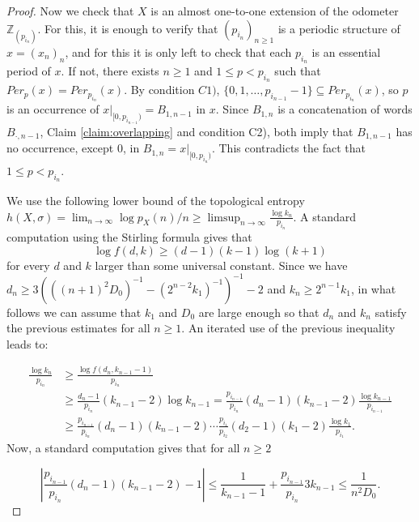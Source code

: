 \documentclass{daj}
\theoremstyle{plain}
\theoremstyle{definition}
\begin{document}
\begin{proof}
	
	Now we check that $X$ is an almost one-to-one extension of the odometer $\mathbb{Z}_{(p_{i_n})}$. 
	For this, it is enough to verify that $(p_{i_n})_{n\geq 1}$ is a periodic structure of $x = (x_{n})_{n}$, and for this it is only left to check that each $p_{i_n}$ is an essential period of $x$. If not, there exists $n \geq 1$ and $1 \leq p <p_{i_n}$ such that $Per_p(x) = Per_{p_{i_n}}(x)$. 
	By condition  $C1)$, $\{0,1,  \ldots, p_{i_{n-1}} -1 \} \subseteq   Per_{p_{i_n}}(x)$, so  $p$ is an occurrence of  $x|_{[0,p_{i_{n-1}})} =  B_{1,n-1}$ in $x$.  Since $B_{1,n}$ is a concatenation of words $B_{\cdot, n-1}$, Claim \ref{claim:overlapping} and condition C2), both  imply that $B_{1,n-1}$ has no  occurrence, except $0$,   in  $B_{1,n} = x|_{[0,p_{i_{n}})}$. This contradicts the fact that $1 \leq p <p_{i_n}$.
	
	
	\medskip
	
	We use the following lower bound of the topological entropy 
	$\displaystyle h(X,\sigma)= \lim_{n\to \infty }\log p_X(n)/n \ge  \limsup_{n\to \infty} \frac{\log k_{n}}{p_{i_{n}}}$.
	A standard computation using the Stirling formula gives that $$ \displaystyle \log f(d,k)   \geq   (d-1)(k-1) \log (k+1)$$ for every $d$ and $k$ larger than some universal constant. 
	Since we have $d_{n} \ge 3 ( ((n+1)^2 D_{0})^{-1}  - (2^{n-2}k_{1})^{-1})^{-1}-2$ and $k_{n} \ge 2^{n-1}k_{1}$, in what follows we can assume that $k_1$ and $D_0$ are large enough so that $d_{n}$ and $k_{n}$ satisfy the previous estimates for all $n \ge 1$. An iterated use of the  previous inequality leads to:
	
	
	\begin{align*} \label{eq.entropie}
	\frac{\log k_{n}}{p_{i_{n}}} & \ge \frac{\log f(d_{n}, k_{n-1}-1)}{p_{i_{n}}} \\
	& \ge   \frac{d_{n}-1}{p_{i_{n}}}  (k_{n-1}-2) \log k_{n-1}   =    \frac{p_{i_{n-1}}}{p_{i_{n}}}  (d_{n}-1) (k_{n-1}-2) \frac{\log k_{n-1}}{p_{i_{n-1}}} \\
	& \ge  \frac{p_{i_{n-1}}}{p_{i_{n}}}  (d_{n}-1)(k_{n-1}-2) \cdots \frac{p_{i_{{1}}}}{p_{i_{2 }}}  (d_{2} -1) (k_{{1}}-2) \frac{\log k_{{1}}}{p_{i_{{1}}}}.
	\end{align*}
	Now, a standard  computation gives that for all $n \geq 2$
	
	$$  \left |\frac{p_{i_{n-1}}}{p_{i_{n}}}  (d_{n}-1)(k_{n-1}-2) -1 \right|  \le\frac 1{k_{n-1}-1}+ \frac{p_{i_{n-1}}}{p_{i_{n}}}3k_{n-1}  \le \frac 1{n^{2} D_{0}}.$$ 
	

\end{proof}
\end{document}

